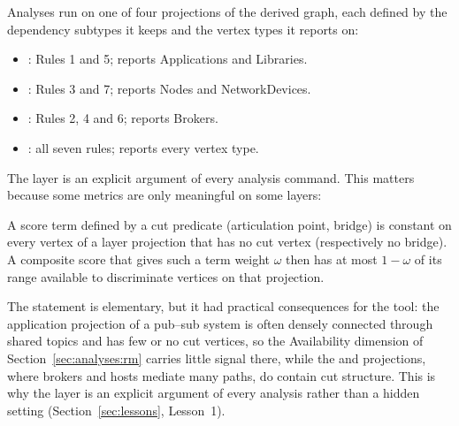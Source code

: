 Analyses run on one of four projections of the derived graph, each defined by the dependency subtypes it keeps and the vertex types it reports on:
\begin{itemize}\tightlist
  \item {}: Rules 1 and 5; reports Applications and Libraries.
  \item {}: Rules 3 and 7; reports Nodes and NetworkDevices.
  \item {}: Rules 2, 4 and 6; reports Brokers.
  \item {}: all seven rules; reports every vertex type.
\end{itemize}
The layer is an explicit argument of every analysis command. This matters because some metrics are only meaningful on some layers:

\begin{proposition}
\label{prop:substrate}
A score term defined by a cut predicate (articulation point, bridge) is constant on every vertex of a layer projection that has no cut vertex (respectively no bridge). A composite score that gives such a term weight $\omega$ then has at most $1-\omega$ of its range available to discriminate vertices on that projection.
\end{proposition}

The statement is elementary, but it had practical consequences for the tool: the application projection of a pub--sub system is often densely connected through shared topics and has few or no cut vertices, so the Availability dimension of Section~\ref{sec:analyses:rm} carries little signal there, while the  and  projections, where brokers and hosts mediate many paths, do contain cut structure. This is why the layer is an explicit argument of every analysis rather than a hidden setting (Section~\ref{sec:lessons}, Lesson~1).
